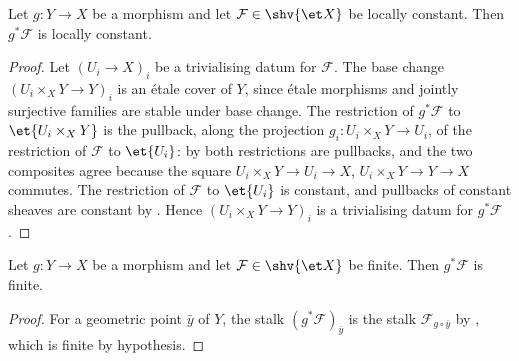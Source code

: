 \begin{lemma}
\label{lemma:constructible-pullback-locally-constant}
\leanok
Let $g\colon Y\to X$ be a morphism and let $\mathcal F\in\shv{\et X}$ be
locally constant.  Then $g^*\mathcal F$ is locally constant.
\end{lemma}
\begin{proof}
\leanok
Let $(U_i\to X)_i$ be a trivialising datum for $\mathcal F$.  The base
change $(U_i\times_XY\to Y)_i$ is an \'etale cover of $Y$, since \'etale
morphisms and jointly surjective families are stable under base change.
The restriction of $g^*\mathcal F$ to $\et{U_i\times_XY}$ is the pullback,
along the projection $g_i\colon U_i\times_XY\to U_i$, of the restriction
of $\mathcal F$ to $\et{U_i}$: by
 both restrictions are
pullbacks, and the two composites agree because the square
$U_i\times_XY\to U_i\to X$, $U_i\times_XY\to Y\to X$ commutes.  The restriction of $\mathcal F$ to $\et{U_i}$ is
constant, and pullbacks of constant sheaves are constant by
.  Hence
$(U_i\times_XY\to Y)_i$ is a trivialising datum for $g^*\mathcal F$.
\end{proof}

\begin{lemma}
\label{lemma:constructible-pullback-finite}
\leanok
Let $g\colon Y\to X$ be a morphism and let $\mathcal F\in\shv{\et X}$ be
finite.  Then $g^*\mathcal F$ is finite.
\end{lemma}
\begin{proof}
\leanok
For a geometric point $\bar y$ of $Y$, the stalk $(g^*\mathcal F)_{\bar y}$
is the stalk $\mathcal F_{g\circ\bar y}$ by
, which is finite by hypothesis.
\end{proof}


